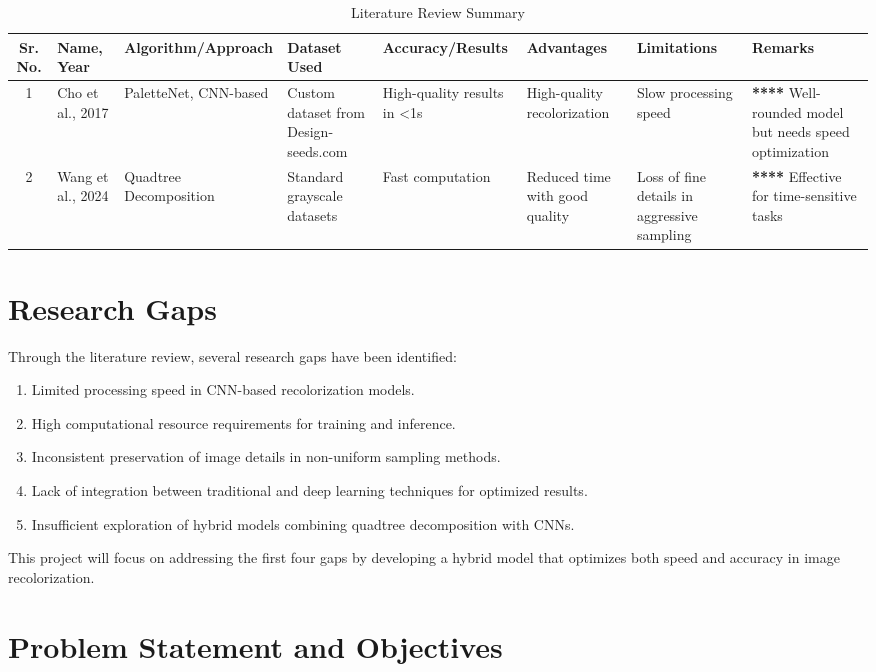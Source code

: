 \documentclass[12pt,a4paper]{report}
\begin{document}
\begin{table}[h!]
\centering
\begin{tabular}{|c|p{3cm}|p{3cm}|p{3cm}|p{2cm}|p{2cm}|p{2cm}|p{2cm}|}
\hline
Sr. No. & Name, Year & Algorithm/Approach & Dataset Used & Accuracy/Results & Advantages & Limitations & Remarks \\
\hline
1 & Cho et al., 2017 & PaletteNet, CNN-based & Custom dataset from Design-seeds.com & High-quality results in <1s & High-quality recolorization & Slow processing speed & \textbf{****} Well-rounded model but needs speed optimization \\
\hline
2 & Wang et al., 2024 & Quadtree Decomposition & Standard grayscale datasets & Fast computation & Reduced time with good quality & Loss of fine details in aggressive sampling & \textbf{****} Effective for time-sensitive tasks \\
\hline
\end{tabular}
\caption{Literature Review Summary}
\label{tab:litreview}
\end{table}

\section*{Research Gaps}

Through the literature review, several research gaps have been identified:
\begin{enumerate}
    \item Limited processing speed in CNN-based recolorization models.
    \item High computational resource requirements for training and inference.
    \item Inconsistent preservation of image details in non-uniform sampling methods.
    \item Lack of integration between traditional and deep learning techniques for optimized results.
    \item Insufficient exploration of hybrid models combining quadtree decomposition with CNNs.
\end{enumerate}

This project will focus on addressing the first four gaps by developing a hybrid model that optimizes both speed and accuracy in image recolorization.

\section*{Problem Statement and Objectives}
\end{document}

